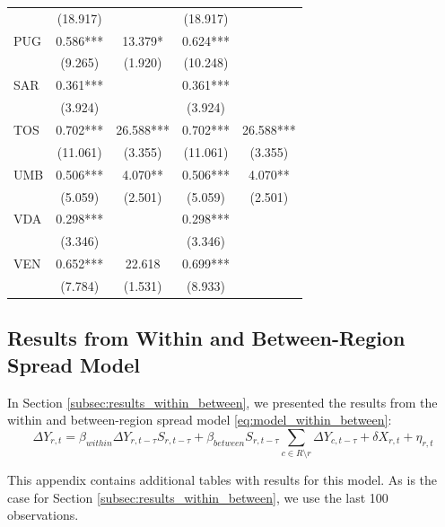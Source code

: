 \documentclass[12pt]{article}
\begin{document}
\begin{appendices}
\begin{longtable}{@{}lcccc@{}}
             & (18.917) &  & (18.917) &  \\ 
            PUG & 0.586*** & 13.379* & 0.624*** &  \\ 
             & (9.265) & (1.920) & (10.248) &  \\ 
            SAR & 0.361*** &  & 0.361*** &  \\ 
             & (3.924) &  & (3.924) &  \\ 
            TOS & 0.702*** & 26.588*** & 0.702*** & 26.588*** \\ 
             & (11.061) & (3.355) & (11.061) & (3.355) \\ 
            UMB & 0.506*** & 4.070** & 0.506*** & 4.070** \\ 
             & (5.059) & (2.501) & (5.059) & (2.501) \\ 
            VDA & 0.298*** &  & 0.298*** &  \\ 
             & (3.346) &  & (3.346) &  \\ 
            VEN & 0.652*** & 22.618 & 0.699*** &  \\ 
             & (7.784) & (1.531) & (8.933) &  \\* \bottomrule
        \end{longtable}
		
		\subsection{Results from Within and Between-Region Spread Model}\label{sapp:results_within_between}
		In Section \ref{subsec:results_within_between}, we presented the results from the within and between-region spread model \eqref{eq:model_within_between}:
		    \begin{equation*}
        		\Delta Y_{r,t} = \beta_{within}\Delta Y_{r,t-\tau} S_{r,t-\tau} + \beta_{between}S_{r,t-\tau}\sum_{c \in R \setminus r} \Delta Y_{c, t-\tau} + \delta X_{r,t} + \eta_{r,t}
        	\end{equation*}
        
        This appendix contains additional tables with results for this model. As is the case for Section \ref{subsec:results_within_between}, we use the last 100 observations.
		

\end{appendices}
\end{document}
